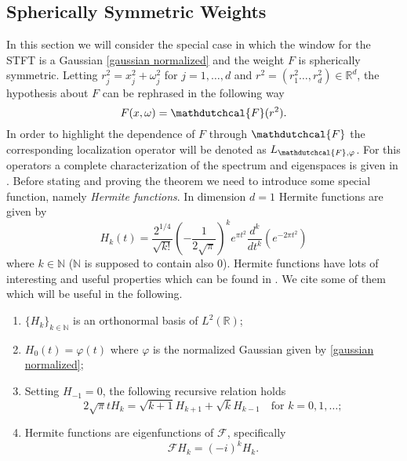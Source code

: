 \documentclass[corpo=11pt, stile=classica, tipotesi=custom,
greek, evenboxes, english]{toptesi}
\numberwithin{equation}{chapter}
\theoremstyle{remark}
\newcommand{\R}{\mathbb{R}} %
\newcommand{\N}{\mathbb{N}} %
\newcommand{\F}{\mathscr{F}} %
\begin{document}
\subsection{Spherically Symmetric Weights}
In this section we will consider the special case in which the window for the STFT is a Gaussian \eqref{gaussian normalized} and the weight $F$ is spherically symmetric. Letting $r_j^2 = x_j^2 + \omega_j^2$ for $j=1,\ldots,d$ and $r^2=(r_1^2\ldots,r_d^2) \in \R^d$, the hypothesis about $F$ can be rephrased in the following way
\begin{equation}\label{sperically symmetric weight}
	F(x,\omega) = \mathdutchcal{F}(r^2).
\end{equation}
{\color{blue} In order to highlight the dependence of $F$ through $\mathdutchcal{F}$ the corresponding localization operator will be denoted as $L_{\mathdutchcal{F},\varphi}$}.
For this operators a complete characterization of the spectrum and eigenspaces is given in \cite{daubechies}. Before stating and proving the theorem we need to introduce some special function, namely \emph{Hermite functions}. In dimension $d=1$ Hermite functions are given by
\begin{equation}\label{Hermite function 1-dimensional}
	H_k(t) = \dfrac{2^{1/4}}{\sqrt{k!}}\left(-\dfrac{1}{2\sqrt{\pi}}\right)^k e^{\pi t^2} \dfrac{d^k}{dt^k}\left(e^{-2\pi t^2}\right)
\end{equation}
where $k \in \N$ ($\N$ is supposed to contain also 0). Hermite functions have lots of interesting and useful properties which can be found in \cite[][Section 1.7]{folland_harmonic}. We cite some of them which will be useful in the following.
\begin{enumerate}[label=(\roman*)]
	\item $\{H_k\}_{k \in \N}$ is an orthonormal basis of $L^2(\R)$;
	\item $H_0(t) = \varphi(t)$ where $\varphi$ is the normalized Gaussian given by \eqref{gaussian normalized};
	\item Setting $H_{-1} = 0$, the following recursive relation holds
	\begin{equation}\label{Hermite functions recursion}
		2\sqrt{\pi}t H_k = \sqrt{k+1}H_{k+1} + \sqrt{k}H_{k-1} \quad \text{for } k=0,1,\ldots;
	\end{equation}
	\item Hermite functions are eigenfunctions of $\F$, specifically
	\begin{equation}\label{Hermite functions are eigenfunctions of Fourier transform}
		\F H_k =(-i)^k H_k.
	\end{equation}
\end{enumerate}
\end{document}
